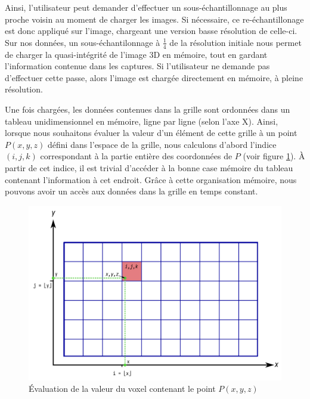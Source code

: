 {{{            %
            Ainsi, l'utilisateur peut demander d'effectuer un sous-échantillonnage au plus proche voisin au moment de charger les images. Si nécessaire, ce re-échantillonage est donc appliqué sur l'image, chargeant une version basse résolution de celle-ci. Sur nos données, un sous-échantilonnage à $\frac{1}{4}$ de la résolution initiale nous permet de charger la quasi-intégrité de l'image 3D en mémoire, tout en gardant l'information contenue dans les captures. Si l'utilisateur ne demande pas d'effectuer cette passe, alors l'image est chargée directement en mémoire, à pleine résolution.


			Une fois chargées, les données contenues dans la grille sont ordonnées dans un tableau unidimensionnel en mémoire, ligne par ligne (selon l'axe X). Ainsi, lorsque nous souhaitons évaluer la valeur d'un élément de cette grille à un point $P(x,y,z)$ défini dans l'espace de la grille, nous calculons d'abord l'indice $(i,j,k)$ correspondant à la partie entière des coordonnées de $P$ (voir figure \ref{img:voxel_fetch}). À partir de cet indice, il est trivial d'accéder à la bonne case mémoire du tableau contenant l'information à cet endroit. Grâce à cette organisation mémoire, nous pouvons avoir un accès aux données dans la grille en temps constant.

			\begin{figure}[h]
			    \centering
			    \includegraphics[width=.8\linewidth]{img/voxel_grid_fetch.png}
			    \caption{\'Evaluation de la valeur du voxel contenant le point $P(x,y,z)$}
			    \label{img:voxel_fetch}
			\end{figure}

}}}
